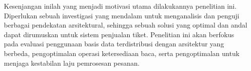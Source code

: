 Kesenjangan inilah yang menjadi motivasi utama dilakukannya penelitian ini. Diperlukan sebuah investigasi yang mendalam untuk menganalisis dan penguji berbagai pendekatan arsitektural, sehingga sebuah solusi yang optimal dan andal dapat dirumuskan untuk sistem penjualan tiket. Penelitian ini akan berfokus pada evaluasi penggunaan basis data terdistribusi dengan arsitektur yang berbeda, pengoptimalan operasi ketersediaan baca, serta pengoptimalan untuk menjaga kestabilan laju pemrosesan pesanan.
